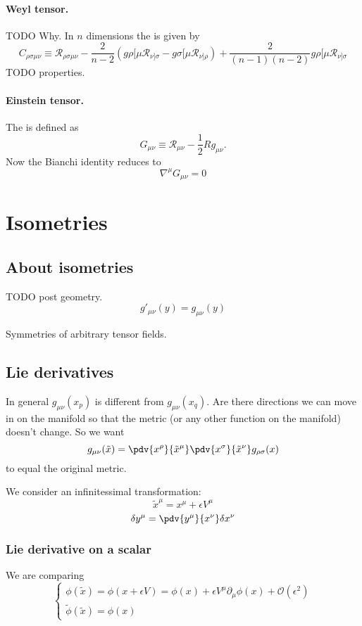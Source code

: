 \paragraph{Weyl tensor.} TODO Why. In $n$ dimensions the  is given by
\[ C_{\rho\sigma\mu\nu} \equiv \mathcal{R}_{\rho\sigma\mu\nu} - \frac{2}{n-2}\left(g{\rho[\mu}\mathcal{R}_{\nu]\sigma} - g{\sigma[\mu}\mathcal{R}_{\nu]\rho}\right) + \frac{2}{(n-1)(n-2)}g{\rho[\mu}\mathcal{R}_{\nu]\sigma} \]
TODO properties.

\paragraph{Einstein tensor.} The  is defined as
\[ G_{\mu\nu} \equiv \mathcal{R}_{\mu\nu} - \frac{1}{2}Rg_{\mu\nu}. \]
Now the Bianchi identity reduces to
\[ \boxed{\nabla^{\mu}G_{\mu\nu} = 0} \]


\section{Isometries}
\subsection{About isometries}
TODO post geometry.
\[ g'_{\mu\nu}(y) = g_{\mu\nu}(y) \]

Symmetries of arbitrary tensor fields.
\subsection{Lie derivatives}
In general $g_{\mu\nu}(x_p)$ is different from $g_{\mu\nu}(x_q)$. Are there directions we can move in on the manifold so that the metric (or any other function on the manifold) doesn't change.
So we want
\[ g_{\mu\nu}(\tilde{x}) = \pdv{x^\rho}{\tilde{x}^\mu}\pdv{x^\sigma}{\tilde{x}^\nu}g_{\rho\sigma}(x) \]
to equal the original metric.

We consider an infinitessimal transformation:
\[ \tilde{x}^\mu = x^\mu+\epsilon V^\mu \]
\[ \delta y^\mu = \pdv{y^\mu}{x^\nu}\delta x^\nu \]

\subsubsection{Lie derivative on a scalar}
We are comparing
\[  \begin{cases}
\phi(\tilde{x}) = \phi(x + \epsilon V) = \phi(x) + \epsilon V^\mu\partial_\mu \phi(x) + \mathcal{O}(\epsilon^2) \\
\tilde{\phi}(\tilde{x}) = \phi(x)
\end{cases}\]

